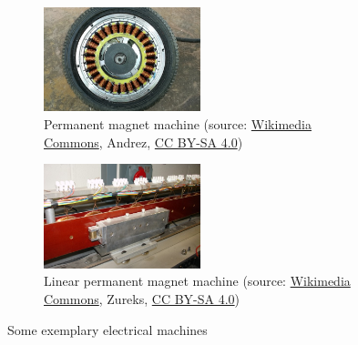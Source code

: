 \begin{frame}
\begin{figure}
		\\
		\begin{subfigure}[b]{0.49\textwidth}
			\centering
			\includegraphics[width=0.5\textwidth]{fig/lec01/Wheel_hub_PMSM.jpg}
			\caption{Permanent magnet machine (source: \href{https://commons.wikimedia.org/wiki/File:Wheel_hub_motor_of_an_electric_kick_scooter,_sidepanel_removed_(2022).jpg}{Wikimedia Commons}, Andrez, \href{https://creativecommons.org/licenses/by-sa/4.0/deed.en}{CC BY-SA 4.0})}
		\end{subfigure}
		\hfill
		\begin{subfigure}[b]{0.49\textwidth}
			\centering
			\includegraphics[width=0.5\textwidth]{fig/lec01/Linear_motor.jpg}
			\caption{Linear permanent magnet machine (source: \href{https://commons.wikimedia.org/wiki/File:Linear_motor_by_Zureks.jpg}{Wikimedia Commons}, Zureks, \href{https://creativecommons.org/licenses/by-sa/4.0/n}{CC BY-SA 4.0})}
		\end{subfigure}
		\caption*{Some exemplary electrical machines} 
        \label{fig:examples_machine_drives_00}
	\end{figure}
\end{frame}


